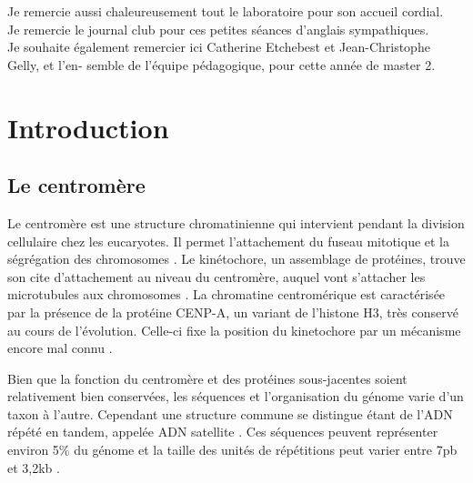 \documentclass[12pt,a4paper]{article}
\begin{document}
Je remercie aussi chaleureusement tout le laboratoire pour son accueil cordial.\\

Je remercie le journal club pour ces petites séances d'anglais sympathiques.\\

Je souhaite également remercier ici Catherine Etchebest et Jean-Christophe Gelly, et l’en-
semble de l’équipe pédagogique, pour cette année de master 2.\\

\thispagestyle{empty}

\newpage
\tableofcontents
\setcounter{page}{0}
\thispagestyle{empty}
\newpage 

\section{Introduction}
\subsection{Le centromère}
Le centromère est une structure chromatinienne qui intervient pendant la division cellulaire chez les eucaryotes. Il permet l'attachement du fuseau mitotique et la ségrégation des chromosomes \cite{Cleveland2003}.  Le kinétochore, un assemblage de protéines, trouve son cite d'attachement au niveau du centromère, auquel vont s'attacher les  microtubules aux chromosomes \cite{Santaguida2009}. La chromatine centromérique est caractérisée par la présence de la protéine CENP-A, un variant de l'histone H3, très conservé au cours de l'évolution. Celle-ci fixe la position du kinetochore par un mécanisme encore mal connu \cite{Sullivan1994}.

Bien que la fonction du centromère et des protéines sous-jacentes soient relativement bien conservées, les séquences et l'organisation du génome varie d'un taxon à l'autre. Cependant une structure commune se distingue étant de l'ADN répété en tandem, appelée ADN satellite \cite{Henikoff2001}. Ces séquences peuvent représenter environ 5\% du génome et la taille des unités de répétitions peut varier entre 7pb et 3,2kb \cite{Cellamare2009}.
\end{document}
